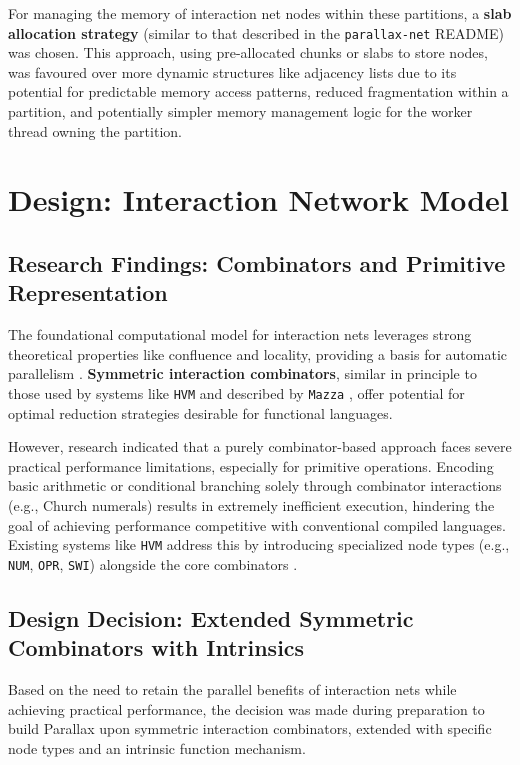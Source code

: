 For managing the memory of interaction net nodes within these partitions, a \textbf{slab allocation strategy} (similar to that described in the \texttt{parallax-net} README) was chosen. This approach, using pre-allocated chunks or slabs to store nodes, was favoured over more dynamic structures like adjacency lists due to its potential for predictable memory access patterns, reduced fragmentation within a partition, and potentially simpler memory management logic for the worker thread owning the partition.

\section{Design: Interaction Network Model}\label{sec:prep_design_model}

\subsection{Research Findings: Combinators and Primitive Representation}
The foundational computational model for interaction nets leverages strong theoretical properties like confluence and locality, providing a basis for automatic parallelism \cite{lafont1990interactionnets}. \textbf{Symmetric interaction combinators}, similar in principle to those used by systems like \texttt{HVM} and described by \texttt{Mazza} \cite{mazza}, offer potential for optimal reduction strategies desirable for functional languages.

However, research indicated that a purely combinator-based approach faces severe practical performance limitations, especially for primitive operations. Encoding basic arithmetic or conditional branching solely through combinator interactions (e.g., Church numerals) results in extremely inefficient execution, hindering the goal of achieving performance competitive with conventional compiled languages. Existing systems like \texttt{HVM} address this by introducing specialized node types (e.g., \texttt{NUM}, \texttt{OPR}, \texttt{SWI}) alongside the core combinators \cite{HVMGithub}.

\subsection{Design Decision: Extended Symmetric Combinators with Intrinsics}
Based on the need to retain the parallel benefits of interaction nets while achieving practical performance, the decision was made during preparation to build Parallax upon symmetric interaction combinators, extended with specific node types and an intrinsic function mechanism.

